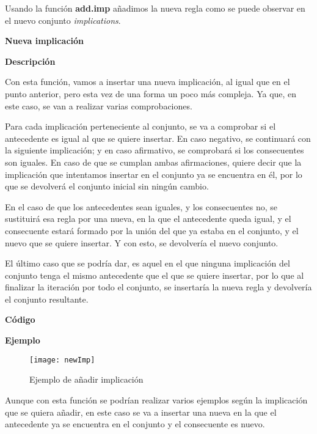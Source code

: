     Usando la funci\'on \textbf{add.imp} a\~nadimos la nueva regla como se puede observar en el nuevo conjunto \textit{implications}.

    \clearpage


\textbf{ \large Nueva implicaci\'on}

\smallskip

    \textbf{Descripci\'on}

    Con esta funci\'on, vamos a insertar una nueva implicaci\'on, al igual que en el punto anterior, pero esta vez 
    de una forma un poco m\'as compleja. Ya que, en este caso, se van a realizar varias comprobaciones.

    Para cada implicaci\'on perteneciente al conjunto, se va a comprobar si el antecedente es igual al que se quiere insertar.
    En caso negativo, se continuar\'a con la siguiente implicaci\'on; y en caso afirmativo, se comprobar\'a si los consecuentes son 
    iguales. En caso de que se cumplan ambas afirmaciones, quiere decir que la implicaci\'on que intentamos insertar en el conjunto 
    ya se encuentra en \'el, por lo que se devolver\'a el conjunto inicial sin ning\'un cambio.

    En el caso de que los antecedentes sean iguales, y los consecuentes no, se sustituir\'a esa regla por una nueva, en la que el antecedente 
    queda igual, y el consecuente estar\'a formado por la uni\'on del que ya estaba en el conjunto, y el nuevo que se quiere insertar. Y con 
    esto, se devolver\'ia el nuevo conjunto.

    El \'ultimo caso que se podr\'ia dar, es aquel en el que ninguna implicaci\'on del conjunto tenga el mismo antecedente que el que se 
    quiere insertar, por lo que al finalizar la iteraci\'on por todo el conjunto, se insertar\'ia la nueva regla y devolver\'ia el conjunto 
    resultante.
    \\

    \clearpage

    \textbf{C\'odigo}

    
    \bigskip

    \textbf{Ejemplo}


    \begin{figure}[H]
        \centering
        \texttt{[image: newImp]}
        \caption{Ejemplo de a\~nadir implicaci\'on}
        \label{fig:newImp}
    \end{figure}

    Aunque con esta funci\'on se podr\'ian realizar varios ejemplos seg\'un la implicaci\'on que se quiera a\~nadir, en este caso se 
    va a insertar una nueva en la que el antecedente ya se encuentra en el conjunto y el consecuente es nuevo.

